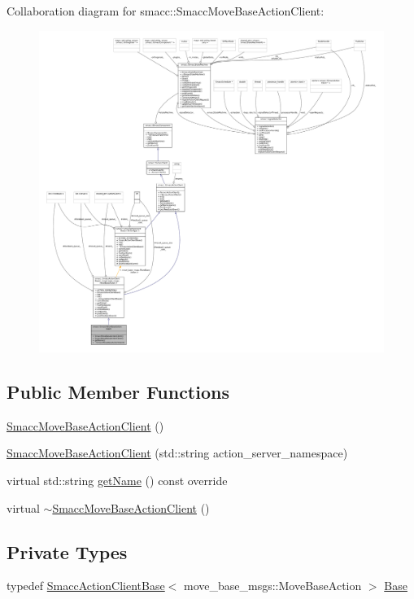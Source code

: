 Collaboration diagram for smacc\+:\+:Smacc\+Move\+Base\+Action\+Client\+:
\nopagebreak
\begin{figure}[H]
\begin{center}
\leavevmode
\includegraphics[width=350pt]{classsmacc_1_1SmaccMoveBaseActionClient__coll__graph}
\end{center}
\end{figure}
\subsection*{Public Member Functions}
\begin{DoxyCompactItemize}
\item 
\hyperlink{classsmacc_1_1SmaccMoveBaseActionClient_aeb88a8a3a45c3fc5d89577316174fe00}{Smacc\+Move\+Base\+Action\+Client} ()
\item 
\hyperlink{classsmacc_1_1SmaccMoveBaseActionClient_a6db7c1a10f8a99e7ee0a3b18d3893dce}{Smacc\+Move\+Base\+Action\+Client} (std\+::string action\+\_\+server\+\_\+namespace)
\item 
virtual std\+::string \hyperlink{classsmacc_1_1SmaccMoveBaseActionClient_ac90f555fadd3b3c9394aca537a9962f4}{get\+Name} () const override
\item 
virtual \hyperlink{classsmacc_1_1SmaccMoveBaseActionClient_a10e2971e7ff4b55a1861abe233d3c24f}{$\sim$\+Smacc\+Move\+Base\+Action\+Client} ()
\end{DoxyCompactItemize}
\subsection*{Private Types}
\begin{DoxyCompactItemize}
\item 
typedef \hyperlink{classsmacc_1_1SmaccActionClientBase}{Smacc\+Action\+Client\+Base}$<$ move\+\_\+base\+\_\+msgs\+::\+Move\+Base\+Action $>$ \hyperlink{classsmacc_1_1SmaccMoveBaseActionClient_ad64340f7f8ac723bdb639c2c830975a7}{Base}
\end{DoxyCompactItemize}
